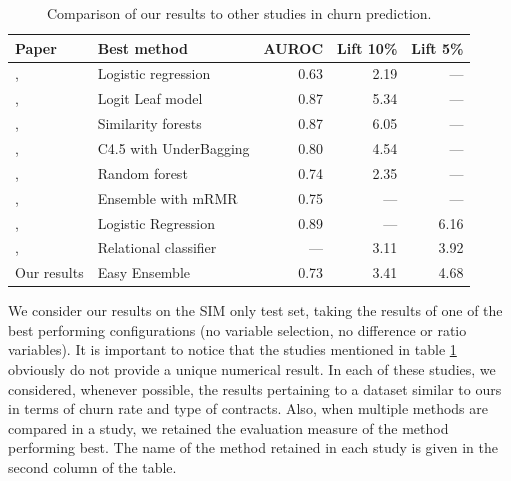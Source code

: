 \begin{table}
    \centering
    \begin{tabular}{llrrr}
        \toprule
        Paper & Best method & AUROC & Lift 10\% & Lift 5\%\\
        \midrule
        \citeauthor*{coussement2017comparative}, \citeyear{coussement2017comparative}
        & Logistic regression & 0.63 & 2.19 & ---  \\
        \citeauthor*{decaigny2018new}, \citeyear{decaigny2018new}
        & Logit Leaf model & 0.87 & 5.34 & ---  \\
        \citeauthor*{oskarsdottir2018time}, \citeyear{oskarsdottir2018time}
        & Similarity forests & 0.87 & 6.05 & ---  \\
        \citeauthor*{zhu2017empirical}, \citeyear{zhu2017empirical}
        & C4.5 with UnderBagging & 0.80 & 4.54 & ---  \\
        \citeauthor*{mitrovic2018operational}, \citeyear{mitrovic2018operational}
        & Random forest & 0.74 & 2.35 & ---  \\
        \citeauthor*{idris2014ensemble}, \citeyear{idris2014ensemble}
        & Ensemble with mRMR & 0.75 & ---  & ---  \\
        \citeauthor*{oskarsdottir2017social}, \citeyear{oskarsdottir2017social}
        & Logistic Regression & 0.89 & ---  & 6.16 \\
        \citeauthor*{verbeke2014social}, \citeyear{verbeke2014social}
        & Relational classifier & ---  & 3.11 & 3.92 \\
        \addlinespace
        Our results & Easy Ensemble & 0.73 & 3.41 & 4.68 \\
        \bottomrule
    \end{tabular}
    \caption{Comparison of our results to other studies in churn prediction.}
    \label{tab:comparison_sota}
\end{table}

We consider our results on the SIM only test set, taking the results of one of
the best performing configurations (no variable selection, no difference or ratio
variables). It is important to notice that the studies mentioned in table
\ref{tab:comparison_sota} obviously do not provide a unique numerical result. In
each of these studies, we considered, whenever possible, the results pertaining
to a dataset similar to ours in terms of churn rate and type of contracts. Also,
when multiple methods are compared in a study, we retained the evaluation
measure of the method performing best. The name of the method retained in each
study is given in the second column of the table.

